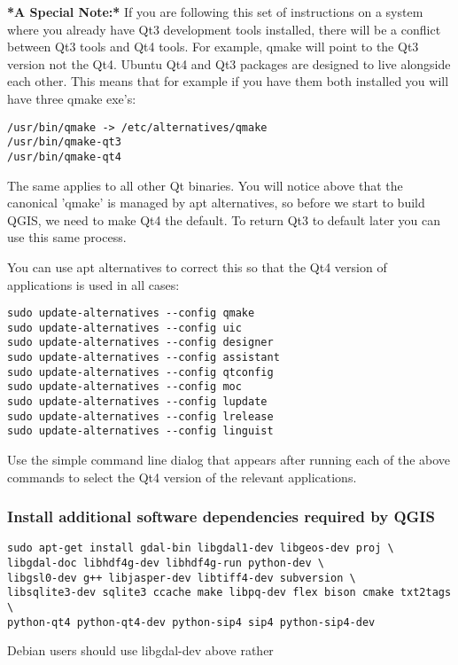 \textbf{*A Special Note:*} If you are following this set of instructions on
a system where you already have Qt3 development tools installed, there will
be a conflict between Qt3 tools and Qt4 tools. For example, qmake will
point to the Qt3 version not the Qt4. Ubuntu Qt4 and Qt3 packages are
designed to live alongside each other. This means that for example if you
have them both installed you will have three qmake exe's:

\begin{verbatim}
/usr/bin/qmake -> /etc/alternatives/qmake 
/usr/bin/qmake-qt3
/usr/bin/qmake-qt4 
\end{verbatim}

The same applies to all other Qt binaries. You will notice above that the
canonical 'qmake' is managed by apt alternatives, so before we start to
build QGIS, we need to make Qt4 the default. To return Qt3 to default later
you can use this same process.

You can use apt alternatives to correct this so that the Qt4 version of
applications is used in all cases:

\begin{verbatim}
sudo update-alternatives --config qmake
sudo update-alternatives --config uic 
sudo update-alternatives --config designer 
sudo update-alternatives --config assistant 
sudo update-alternatives --config qtconfig 
sudo update-alternatives --config moc 
sudo update-alternatives --config lupdate 
sudo update-alternatives --config lrelease 
sudo update-alternatives --config linguist 
\end{verbatim}

Use the simple command line dialog that appears after running each of the
above commands to select the Qt4 version of the relevant applications.

\hypertarget{toc46}{}
\subsubsection{Install additional software dependencies required by QGIS}
\begin{verbatim}
sudo apt-get install gdal-bin libgdal1-dev libgeos-dev proj \
libgdal-doc libhdf4g-dev libhdf4g-run python-dev \
libgsl0-dev g++ libjasper-dev libtiff4-dev subversion \
libsqlite3-dev sqlite3 ccache make libpq-dev flex bison cmake txt2tags \
python-qt4 python-qt4-dev python-sip4 sip4 python-sip4-dev
\end{verbatim}

Debian users should use libgdal-dev above rather

